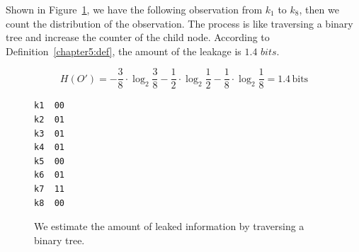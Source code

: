 \begin{myexample}
Shown in Figure~\ref{fig:design:example2}, we have the following observation from $k_1$ to $k_8$, then we count the distribution of  the observation. The process is like traversing a binary tree and increase the counter of the child node. According to Definition~\ref{chapter5:def}, the amount of the leakage is $1.4$ $\mathit{bits}$.

\begin{displaymath}
  H(O') = - \frac{3}{8} \cdot \log_2{\frac{3}{8}}- \frac{1}{2} \cdot \log_2{\frac{1}{2}}
  - \frac{1}{8} \cdot \log_2{\frac{1}{8}} = 1.4 \,\mathrm{bits}
\end{displaymath}

\begin{figure}[h]
  \begin{minipage}{0.3\linewidth}
    \end{minipage}
  \hfill
  \begin{minipage}{0.15\linewidth}
    {
      \begin{lstlisting}[frame=none, numbers=none]
k1  00
k2  01
k3  01
k4  01
k5  00
k6  01
k7  11
k8  00
\end{lstlisting}
    }
  \end{minipage}
  \hfill
  \begin{minipage}{0.3\linewidth}
  \end{minipage}
  \caption{We estimate the amount of leaked information by traversing a binary tree.}\label{fig:design:example2}
\end{figure}
\end{myexample}


